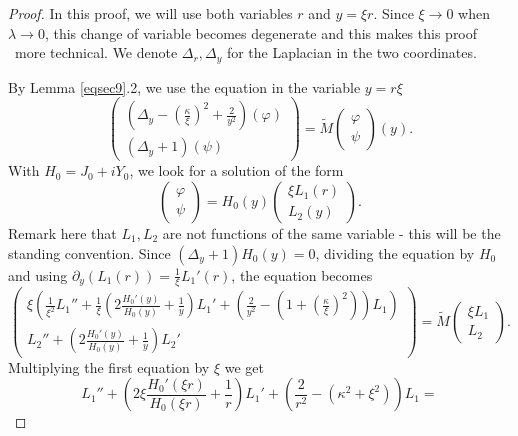 \documentclass[11 pt]{amsart}
\theoremstyle{definition}
\theoremstyle{remark}
\numberwithin{equation}{section}
\begin{document}
\begin{proof}
  In this proof, we will use both variables $r$ and $y = \xi r$. Since $\xi
  \rightarrow 0$ when $\lambda \rightarrow 0$, this change of variable becomes
  degenerate and this makes this proof \ more technical. We denote $\Delta_r,
  \Delta_y$ for the Laplacian in the two coordinates.
  
  By Lemma \ref{eqsec9}.2, we use the equation in the variable $y = r \xi$
  \[ \left(\begin{array}{c}
       \left( \Delta_y - \left( \frac{\kappa}{\xi} \right)^2 + \frac{2}{y^2}
       \right) (\varphi)\\
       (\Delta_y + 1) (\psi)
     \end{array}\right) = \widetilde{M} \left(\begin{array}{c}
       \varphi\\
       \psi
     \end{array}\right) (y) . \]
  With $H_0 = J_0 + i Y_0$, we look for a solution of the form
  \[ \left(\begin{array}{c}
       \varphi\\
       \psi
     \end{array}\right) = H_0 (y) \left(\begin{array}{c}
       \xi L_1 (r)\\
       L_2 (y)
     \end{array}\right) . \]
  Remark here that $L_1, L_2$ are not functions of the same variable - this will be the standing convention. Since $(\Delta_y + 1) H_0 (y) = 0$, dividing the
  equation by $H_0$ and using $\partial_y (L_1 (r)) = \frac{1}{\xi} L_1' (r)$, the equation becomes
  \[ \left(\begin{array}{c}
       \xi \left( \frac{1}{\xi^2} L_1'' + \frac{1}{\xi} \left( 2 \frac{H_0'
       (y)}{H_0 (y)} + \frac{1}{y} \right) L_1' + \left( \frac{2}{y^2} -
       \left( 1 + \left( \frac{\kappa}{\xi} \right)^2 \right) \right) L_1
       \right)\\
       L_2'' + \left( 2 \frac{H_0' (y)}{H_0 (y)} + \frac{1}{y} \right) L_2'
     \end{array}\right) = \widetilde{M} \left(\begin{array}{c}
       \xi L_1\\
       L_2
     \end{array}\right) . \]
  Multiplying the first equation by $\xi$ we get
  \[ L_1'' + \left( 2 \xi \frac{H_0' (\xi r)}{H_0 (\xi r)} + \frac{1}{r}
     \right) L_1' + \left( \frac{2}{r^2} - (\kappa^2 + \xi^2) \right) L_1 =
\]
\end{proof}
\end{document}
